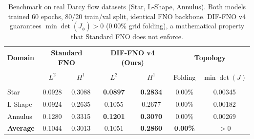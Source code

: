 \begin{table}[h]
\centering
\caption{Benchmark on real Darcy flow datasets (Star, L-Shape, Annulus). 
Both models trained 60 epochs, 80/20 train/val split, identical FNO backbone. 
DIF-FNO v4 guarantees $\min \det(J_\phi) > 0$ (0.00\% grid folding), 
a mathematical property that Standard FNO does not enforce.}
\label{tab:benchmark}
\begin{tabular}{l|cc|cc|cc}
\hline
\textbf{Domain} & \multicolumn{2}{c|}{\textbf{Standard FNO}} & 
\multicolumn{2}{c|}{\textbf{DIF-FNO v4 (Ours)}} & \multicolumn{2}{c}{\textbf{Topology}} \\\\
 & $L^2$ & $H^1$ & $L^2$ & $H^1$ & Folding & $\min \det(J)$ \\\\
\hline
Star & 0.0928 & 0.3088 & \textbf{0.0897} & \textbf{0.2834} & 0.00\% & 0.00345 \\
L-Shape & 0.0924 & 0.2635 & 0.1055 & 0.2677 & 0.00\% & 0.00182 \\
Annulus & 0.1280 & 0.3315 & \textbf{0.1201} & \textbf{0.3070} & 0.00\% & 0.00269 \\
\hline
\textbf{Average} & 0.1044 & 0.3013 & 0.1051 & \textbf{0.2860} & \textbf{0.00\%} & \textbf{$>0$} \\
\hline
\end{tabular}
\end{table}
